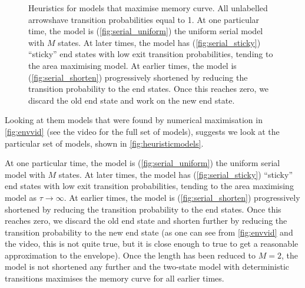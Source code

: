 \documentclass[12pt]{article}
\begin{document}
\begin{figure}[tb]
  \centering
  \begin{myenuma}
    \item{}\hspace{0.02\linewidth}\label{fig:serial_uniform}
    \item{}\hspace{0.02\linewidth}\label{fig:serial_sticky}
    \item{}\label{fig:serial_shorten}
  \end{myenuma}
  \caption[Heuristic optimal models]{Heuristics for models that maximise memory curve.
  All unlabelled arrowshave transition probabilities equal to 1.
  At one particular time, the model is (\ref{fig:serial_uniform}) the uniform serial model with $M$ states.
  At later times, the model has (\ref{fig:serial_sticky}) ``sticky'' end states with low exit transition probabilities, tending to the area maximising model.
  At earlier times, the model is (\ref{fig:serial_shorten}) progressively shortened by reducing the transition probability to the end states.
  Once this reaches zero, we discard the old end state and work on the new end state.} \label{fig:heuristicmodels}
\end{figure}


Looking at them models that were found by numerical maximisation in \autoref{fig:envvid} (see the video for the full set of models), suggests we look at the particular set of models, shown in \autoref{fig:heuristicmodels}.

At one particular time, the model is (\ref{fig:serial_uniform}) the uniform serial model with $M$ states.
At later times, the model has (\ref{fig:serial_sticky}) ``sticky'' end states with low exit transition probabilities, tending to the area maximising model as $\tau\to\infty$.
At earlier times, the model is (\ref{fig:serial_shorten}) progressively shortened by reducing the transition probability to the end states.
Once this reaches zero, we discard the old end state and shorten further by reducing the transition probability to the new end state (as one can see from \autoref{fig:envvid} and the video, this is not quite true, but it is close enough to true to get a reasonable approximation to the envelope).
Once the length has been reduced to $M=2$, the model is not shortened any further and the two-state model with deterministic transitions maximises the memory curve for all earlier times.
\end{document}
